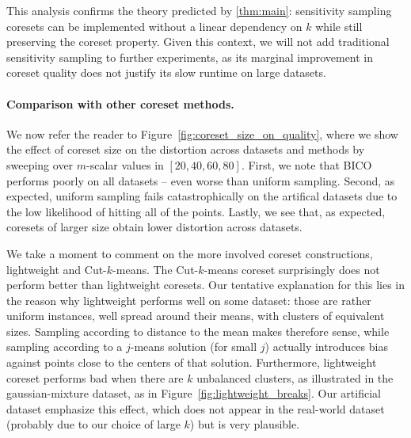 This analysis confirms the theory predicted by \cref{thm:main}: sensitivity sampling coresets can be
implemented without a linear dependency on $k$ while still preserving the coreset property. Given this context, we will not add traditional sensitivity sampling
to further experiments, as its marginal improvement in coreset quality does not justify its slow runtime on large datasets.


\paragraph*{Comparison with other coreset methods.}

We now refer the reader to Figure~\ref{fig:coreset_size_on_quality}, where we show the effect of coreset size on the distortion across datasets and methods by
sweeping over $m$-scalar values in $[20, 40, 60, 80]$. 
First, we note that BICO performs poorly on all datasets -- even worse than uniform sampling.
Second, as expected, uniform sampling fails catastrophically on the artifical datasets due to the low likelihood of hitting all of the points.
Lastly, we see that, as expected, coresets of larger size obtain lower distortion across datasets.

We take a moment to comment on the more involved coreset constructions, lightweight and Cut-$k$-means. The Cut-$k$-means coreset surprisingly does not perform better than
lightweight coresets. Our tentative explanation for this lies in the reason why lightweight performs well on some dataset: those are rather uniform instances, well
spread around their means, with clusters of equivalent sizes.  Sampling according to distance to the mean makes therefore sense,
while sampling according to a $j$-means solution (for small $j$) actually introduces bias against points close to the centers of that solution.  Furthermore,
lightweight coreset performs bad when there are $k$ unbalanced clusters, as illustrated in the gaussian-mixture dataset, as in
Figure~\ref{fig:lightweight_breaks}.  Our artificial dataset emphasize this effect, which does not appear in the real-world dataset (probably due to our choice
of large $k$) but is very plausible.  

